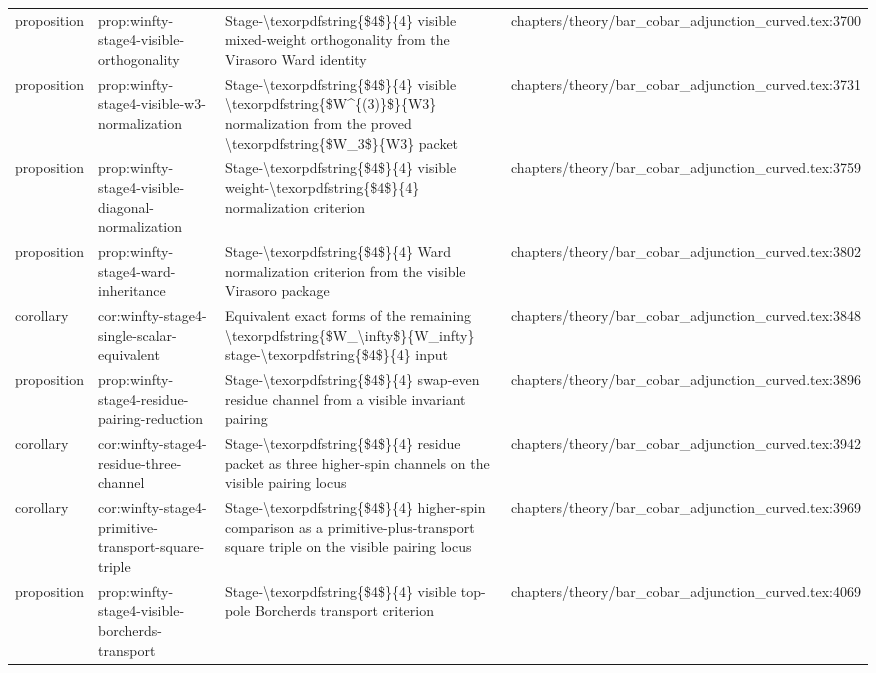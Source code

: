 \documentclass[11pt]{article}
\begin{document}
\begin{longtable}{L{0.10\textwidth}L{0.26\textwidth}L{0.42\textwidth}L{0.22\textwidth}}
proposition & prop:winfty-stage4-visible-orthogonality & Stage-\textbackslash{}texorpdfstring\{\$4\$\}\{4\} visible mixed-weight orthogonality from the Virasoro Ward identity & chapters/theory/bar\_cobar\_adjunction\_curved.tex:3700\\
proposition & prop:winfty-stage4-visible-w3-normalization & Stage-\textbackslash{}texorpdfstring\{\$4\$\}\{4\} visible \textbackslash{}texorpdfstring\{\$W\textasciicircum{}\{(3)\}\$\}\{W3\} normalization from the proved \textbackslash{}texorpdfstring\{\$W\_3\$\}\{W3\} packet & chapters/theory/bar\_cobar\_adjunction\_curved.tex:3731\\
proposition & prop:winfty-stage4-visible-diagonal-normalization & Stage-\textbackslash{}texorpdfstring\{\$4\$\}\{4\} visible weight-\textbackslash{}texorpdfstring\{\$4\$\}\{4\} normalization criterion & chapters/theory/bar\_cobar\_adjunction\_curved.tex:3759\\
proposition & prop:winfty-stage4-ward-inheritance & Stage-\textbackslash{}texorpdfstring\{\$4\$\}\{4\} Ward normalization criterion from the visible Virasoro package & chapters/theory/bar\_cobar\_adjunction\_curved.tex:3802\\
corollary & cor:winfty-stage4-single-scalar-equivalent & Equivalent exact forms of the remaining \textbackslash{}texorpdfstring\{\$W\_\textbackslash{}infty\$\}\{W\_infty\} stage-\textbackslash{}texorpdfstring\{\$4\$\}\{4\} input & chapters/theory/bar\_cobar\_adjunction\_curved.tex:3848\\
proposition & prop:winfty-stage4-residue-pairing-reduction & Stage-\textbackslash{}texorpdfstring\{\$4\$\}\{4\} swap-even residue channel from a visible invariant pairing & chapters/theory/bar\_cobar\_adjunction\_curved.tex:3896\\
corollary & cor:winfty-stage4-residue-three-channel & Stage-\textbackslash{}texorpdfstring\{\$4\$\}\{4\} residue packet as three higher-spin channels on the visible pairing locus & chapters/theory/bar\_cobar\_adjunction\_curved.tex:3942\\
corollary & cor:winfty-stage4-primitive-transport-square-triple & Stage-\textbackslash{}texorpdfstring\{\$4\$\}\{4\} higher-spin comparison as a primitive-plus-transport square triple on the visible pairing locus & chapters/theory/bar\_cobar\_adjunction\_curved.tex:3969\\
proposition & prop:winfty-stage4-visible-borcherds-transport & Stage-\textbackslash{}texorpdfstring\{\$4\$\}\{4\} visible top-pole Borcherds transport criterion & chapters/theory/bar\_cobar\_adjunction\_curved.tex:4069\\

\end{longtable}
\end{document}
